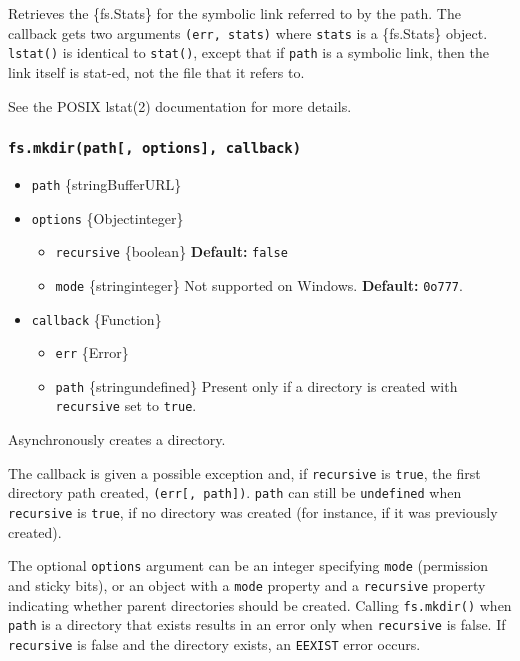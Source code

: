 Retrieves the \{fs.Stats\} for the symbolic link referred to by the
path. The callback gets two arguments \texttt{(err,\ stats)} where
\texttt{stats} is a \{fs.Stats\} object. \texttt{lstat()} is identical
to \texttt{stat()}, except that if \texttt{path} is a symbolic link,
then the link itself is stat-ed, not the file that it refers to.

See the POSIX lstat(2) documentation for more details.

\subsubsection{\texorpdfstring{\texttt{fs.mkdir(path{[},\ options{]},\ callback)}}{fs.mkdir(path{[}, options{]}, callback)}}\label{fs.mkdirpath-options-callback}

\begin{itemize}
\tightlist
\item
  \texttt{path} \{string\textbar Buffer\textbar URL\}
\item
  \texttt{options} \{Object\textbar integer\}

  \begin{itemize}
  \tightlist
  \item
    \texttt{recursive} \{boolean\} \textbf{Default:} \texttt{false}
  \item
    \texttt{mode} \{string\textbar integer\} Not supported on Windows.
    \textbf{Default:} \texttt{0o777}.
  \end{itemize}
\item
  \texttt{callback} \{Function\}

  \begin{itemize}
  \tightlist
  \item
    \texttt{err} \{Error\}
  \item
    \texttt{path} \{string\textbar undefined\} Present only if a
    directory is created with \texttt{recursive} set to \texttt{true}.
  \end{itemize}
\end{itemize}

Asynchronously creates a directory.

The callback is given a possible exception and, if \texttt{recursive} is
\texttt{true}, the first directory path created,
\texttt{(err{[},\ path{]})}. \texttt{path} can still be
\texttt{undefined} when \texttt{recursive} is \texttt{true}, if no
directory was created (for instance, if it was previously created).

The optional \texttt{options} argument can be an integer specifying
\texttt{mode} (permission and sticky bits), or an object with a
\texttt{mode} property and a \texttt{recursive} property indicating
whether parent directories should be created. Calling
\texttt{fs.mkdir()} when \texttt{path} is a directory that exists
results in an error only when \texttt{recursive} is false. If
\texttt{recursive} is false and the directory exists, an \texttt{EEXIST}
error occurs.

